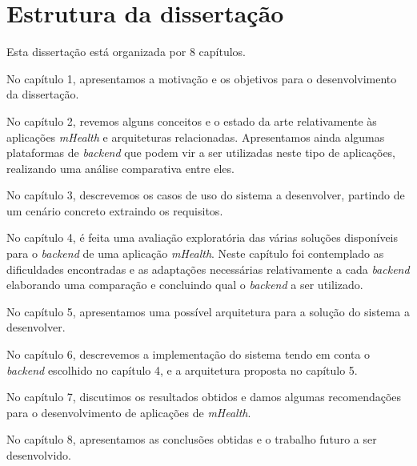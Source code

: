 \section{Estrutura da dissertação}
Esta dissertação está organizada por 8 capítulos.\par 
No capítulo 1, apresentamos a motivação e os objetivos para o desenvolvimento da dissertação.\par 
No capítulo 2, revemos alguns conceitos e o estado da arte relativamente às aplicações \textit{mHealth} e arquiteturas relacionadas. Apresentamos ainda algumas plataformas de \textit{backend} que podem vir a ser utilizadas neste tipo de aplicações, realizando uma análise comparativa entre eles.\par 
No capítulo 3, descrevemos os casos de uso do sistema a desenvolver, partindo de um cenário concreto extraindo os requisitos.\par 
No capítulo 4, é feita uma avaliação exploratória das várias soluções disponíveis para o \textit{backend} de uma aplicação \textit{mHealth}. Neste capítulo foi contemplado as dificuldades encontradas e as adaptações necessárias relativamente a cada \textit{backend} elaborando uma comparação e concluindo qual o \textit{backend} a ser utilizado. \par
No capítulo 5, apresentamos uma possível arquitetura para a solução do sistema a desenvolver. \par 
No capítulo 6, descrevemos a implementação do sistema tendo em conta o \textit{backend} escolhido no capítulo 4, e a arquitetura proposta no capítulo 5. \par 
No capítulo 7, discutimos os resultados obtidos e damos algumas recomendações para o desenvolvimento de aplicações de \textit{mHealth}. \par 
No capítulo 8, apresentamos as conclusões obtidas e o trabalho futuro a ser desenvolvido.
\cleardoublepage